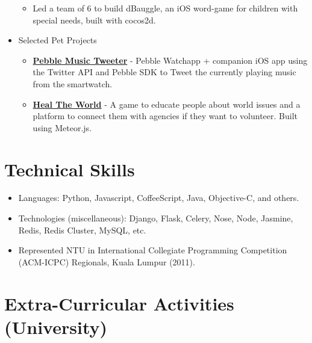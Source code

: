 \begin{itemize}
  \begin{itemize}
  \tightlist
  \item
    Led a team of 6 to build dBauggle, an iOS word-game for children
    with special needs, built with cocos2d.
  \end{itemize}
\item
  Selected Pet Projects

  \begin{itemize}
  \tightlist
  \item
    \href{https://github.com/radzinzki/Pebble-MusicTweeter}{\textbf{Pebble
    Music Tweeter}} - Pebble Watchapp + companion iOS app using the
    Twitter API and Pebble SDK to Tweet the currently playing music from
    the smartwatch.
  \item
    \href{http://healtheworld.meteor.com/}{\textbf{Heal The World}} - A
    game to educate people about world issues and a platform to connect
    them with agencies if they want to volunteer. Built using Meteor.js.
  \end{itemize}
\end{itemize}

\section{Technical Skills}\label{technical-skills}

\begin{itemize}
\tightlist
\item
  Languages: Python, Javascript, CoffeeScript, Java, Objective-C, and
  others.
\item
  Technologies (miscellaneous): Django, Flask, Celery, Nose, Node,
  Jasmine, Redis, Redis Cluster, MySQL, etc.
\item
  Represented NTU in International Collegiate Programming Competition
  (ACM-ICPC) Regionals, Kuala Lumpur (2011).
\end{itemize}

\section{Extra-Curricular Activities
(University)}\label{extra-curricular-activities-university}

